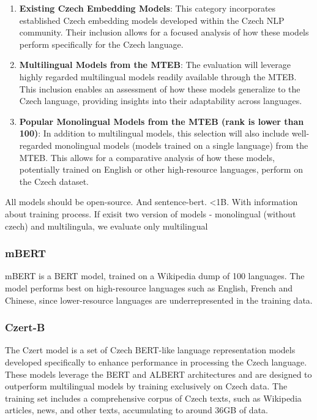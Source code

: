 \begin{enumerate}
  \item \textbf{Existing Czech Embedding Models}: This category incorporates established Czech embedding models developed within the Czech NLP community. Their inclusion allows for a focused analysis of how these models perform specifically for the Czech language.
  \item \textbf{Multilingual Models from the \ac{MTEB}}: The evaluation will leverage highly regarded multilingual models readily available through the \ac{MTEB}. This inclusion enables an assessment of how these models generalize to the Czech language, providing insights into their adaptability across languages.
  \item \textbf{Popular Monolingual Models from the \ac{MTEB} (rank is lower than 100)}: In addition to multilingual models, this selection will also include well-regarded monolingual models (models trained on a single language) from the \ac{MTEB}. This allows for a comparative analysis of how these models, potentially trained on English or other high-resource languages, perform on the Czech dataset.
\end{enumerate}

All models should be open-source. And sentence-bert. <1B. With information about training process.
If exisit two version of models - monolingual (without czech) and multilingula, we evaluate only multilingual

\subsubsection{mBERT \cite{bert_mbert}}
\ac{mBERT} is a \ac{BERT} model, trained on a Wikipedia dump of 100 languages.
The model performs best on high-resource languages such as English, French and Chinese, since lower-resource languages are underrepresented in the training data.

\subsubsection{Czert-B \cite{czert}}

The Czert model is a set of Czech \ac{BERT}-like language representation models developed specifically to enhance performance in processing the Czech language.
These models leverage the \ac{BERT} and \ac{ALBERT} \cite{ALBERT} architectures and are designed to outperform multilingual models by training exclusively on Czech data.
The training set includes a comprehensive corpus of Czech texts, such as Wikipedia articles, news, and other texts, accumulating to around 36GB of data.

